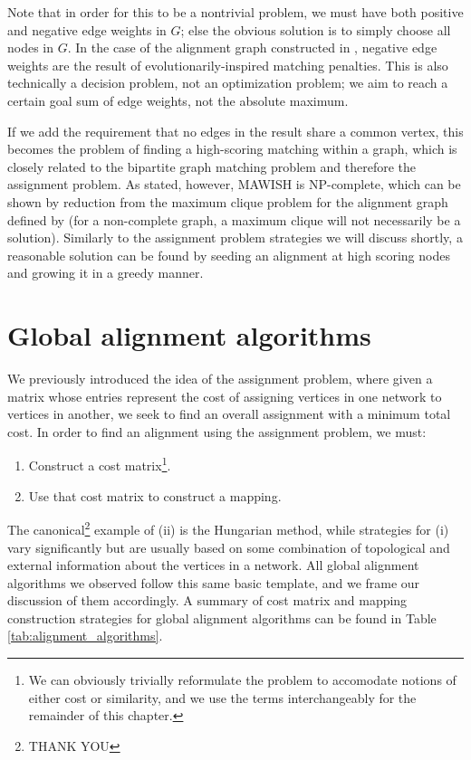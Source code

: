 \documentclass[12pt]{thesis}
\theoremstyle{plain}
\theoremstyle{definition}
\theoremstyle{remark}
\begin{document}
Note that in order for this to be a nontrivial problem, we must have both positive and negative edge weights in $G$; else the obvious solution is to simply choose all nodes in $G$. In the case of the alignment graph constructed in \cite{Koyuturk_2006}, negative edge weights are the result of evolutionarily-inspired matching penalties. This is also technically a decision problem, not an optimization problem; we aim to reach a certain goal sum of edge weights, not the absolute maximum.

If we add the requirement that no edges in the result share a common vertex, this becomes the problem of finding a high-scoring matching within a graph, which is closely related to the bipartite graph matching problem and therefore the assignment problem. As stated, however, MAWISH is NP-complete, which can be shown by reduction from the maximum clique problem for the alignment graph defined by \cite{Koyuturk_2006} (for a non-complete graph, a maximum clique will not necessarily be a solution). Similarly to the assignment problem strategies we will discuss shortly, a reasonable solution can be found by seeding an alignment at high scoring nodes and growing it in a greedy manner.








\section{Global alignment algorithms}

We previously introduced the idea of the assignment problem, where given a matrix whose entries represent the cost of assigning vertices in one network to vertices in another, we seek to find an overall assignment with a minimum total cost. In order to find an alignment using the assignment problem, we must:

\begin{enumerate}
\item Construct a cost matrix\footnote{We can obviously trivially reformulate the problem to accomodate notions of either cost or similarity, and we use the terms interchangeably for the remainder of this chapter.}.
\item Use that cost matrix to construct a mapping.
\end{enumerate}

The canonical\footnote{THANK YOU} example of (ii) is the Hungarian method, while strategies for (i) vary significantly but are usually based on some combination of topological and external information about the vertices in a network. All global alignment algorithms we observed follow this same basic template, and we frame our discussion of them accordingly. A summary of cost matrix and mapping construction strategies for global alignment algorithms can be found in Table \ref{tab:alignment_algorithms}.
\end{document}
